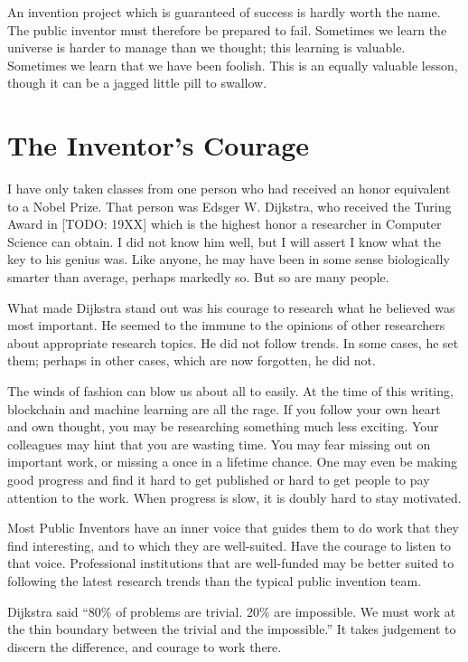 \documentclass[
	fontsize=10pt, %
	twoside=false, %
	secnumdepth=1, %
]{kaobook}
\begin{document}
An invention project which is guaranteed of success is hardly worth the name.
The public inventor must therefore be prepared to fail.
Sometimes we learn the universe is harder to manage than we thought;
this learning is valuable.
Sometimes we learn that we have been foolish.
This is an equally valuable lesson, though it can be a jagged little pill
to swallow.

\section{The Inventor's Courage}

I have only taken classes from one person who had received an honor equivalent to a Nobel Prize.
That person was Edsger W. Dijkstra, who received the Turing Award in [TODO: 19XX] which is
the highest honor a researcher in Computer Science can obtain.
I did not know him well, but I will assert I know what the key to his genius was.
Like anyone, he may have been in some sense biologically smarter than average, perhaps markedly so.
But so are many people.

What made Dijkstra stand out was his courage to research what he believed was most important.
He seemed to the immune to the opinions of other researchers about appropriate research topics.
He did not follow trends. In some cases, he set them; perhaps in other cases, which are now forgotten,
he did not.

The winds of fashion can blow us about all to easily. At the time of this writing,
blockchain and machine learning are all the rage.
If you follow your own heart and own thought, you may be researching something
much less exciting.
Your colleagues may hint that you are wasting time.
You may fear missing out on important work, or missing a once in a lifetime chance.
One may even be making good progress and find it hard to get published or hard
to get people to pay attention to the work. When progress is slow, it is doubly
hard to stay motivated.

Most Public Inventors have an inner voice that guides them to do work that they
find interesting, and to which they are well-suited.
Have the courage to listen to that voice.
Professional institutions that are well-funded may be
better suited to following the latest research trends than the typical public invention team.

Dijkstra said ``80\% of problems are trivial. 20\% are impossible. We must work at the thin boundary between the trivial and the impossible.''
It takes judgement to discern the difference, and courage to work there.
\end{document}
